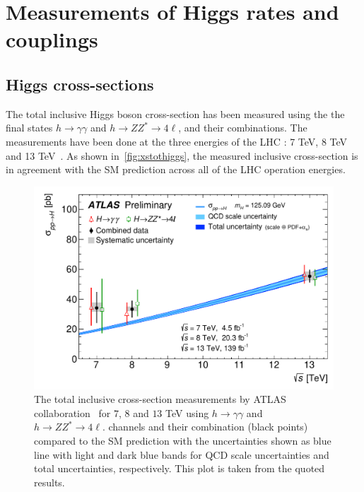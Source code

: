 \section{Measurements of Higgs rates and couplings \label{sec:Higgscoupl} }
\subsection{Higgs cross-sections}
\par The total inclusive Higgs boson cross-section has been measured using the the final states $ h \to \gamma \gamma$ and $ h\to Z Z^* \to 4 \ell$, and their combinations.  The measurements have been done at the three energies of the LHC : 7 TeV, 8 TeV ~\cite{CMS:2015zpx} and 13 TeV~\cite{TheATLAScollaboration:2015uuh,CMS:2018gwt,CMS:2021ugl.ATLAS:2019mju}. As shown in~\autoref{fig:xstothiggs}, the measured inclusive cross-section is in agreement with the SM prediction across all of the LHC operation energies.
\begin{figure}[htb!]
	\begin{center}
		\includegraphics[height=0.35\textheight]{figures/Higgs_results/fig_01}
		\caption{The total inclusive cross-section measurements by ATLAS collaboration~\cite{ATLAS:2019mju} for $7$, $8$ and $13$ TeV using  $ h \to \gamma \gamma$ and $ h\to Z Z^* \to 4 \ell$. channels and their combination (black points) compared to the SM prediction with the  uncertainties shown as blue line with light and dark blue bands for QCD scale uncertainties and total uncertainties, respectively. This plot is taken from the quoted results.}	
		\label{fig:xstothiggs}
	\end{center}
\end{figure}
